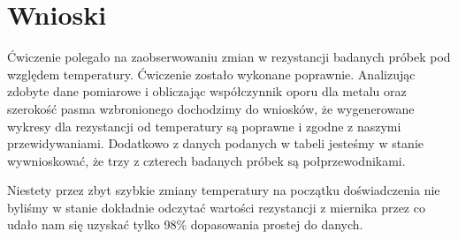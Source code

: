 \newpage
\section{Wnioski}
Ćwiczenie polegało na zaobserwowaniu zmian w rezystancji badanych próbek pod względem temperatury. Ćwiczenie zostało wykonane poprawnie. Analizując zdobyte dane pomiarowe i obliczając współczynnik oporu dla metalu oraz szerokość pasma wzbronionego dochodzimy do wniosków, że wygenerowane wykresy dla rezystancji od temperatury są poprawne i zgodne z naszymi przewidywaniami. Dodatkowo z danych podanych w tabeli jesteśmy w stanie wywnioskować, że trzy z czterech badanych próbek są połprzewodnikami.

Niestety przez zbyt szybkie zmiany temperatury na początku doświadczenia nie byliśmy w stanie dokładnie odczytać wartości rezystancji z miernika przez co udało nam się uzyskać tylko 98\% dopasowania prostej do danych.
